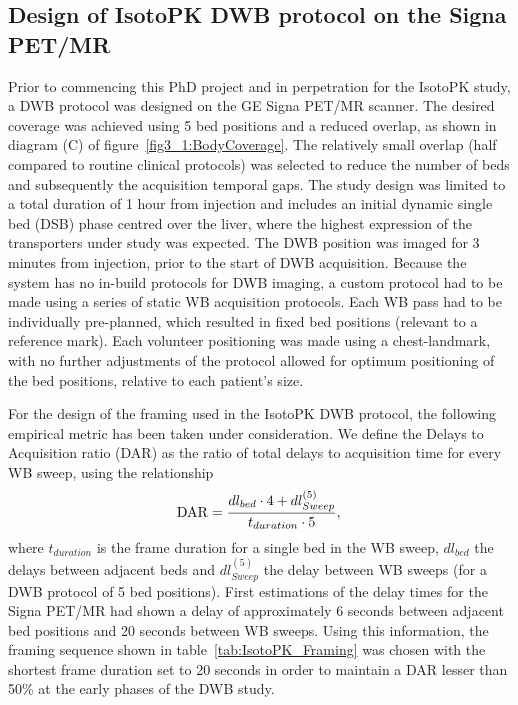 \subsection{Design of IsotoPK DWB protocol on the Signa PET/MR}
Prior to commencing this PhD project and in perpetration for the IsotoPK study, a DWB protocol was designed on the GE Signa PET/MR scanner. The desired coverage was achieved using 5 bed positions and a reduced overlap, as shown in diagram (C) of figure~\ref{fig3_1:BodyCoverage}. The relatively small overlap (half compared to routine clinical protocols) was selected to reduce the number of beds and subsequently the acquisition temporal gaps.
The study design was limited to a total duration of 1 hour from injection and includes an initial dynamic single bed (DSB) phase centred over the liver, where the highest expression of the transporters under study was expected. 
The DWB position was imaged for 3 minutes from injection, prior to the start of DWB acquisition.
Because the system has no in-build protocols for DWB imaging, a custom protocol had to be made using a series of static WB acquisition protocols. Each WB pass had to be individually pre-planned, which resulted in fixed bed positions (relevant to a reference mark). Each volunteer positioning was made using a chest-landmark, with no further adjustments of the protocol allowed for optimum positioning of the bed positions, relative to each patient's size.

For the design of the framing used in the IsotoPK DWB protocol, the following empirical metric has been taken under consideration. We define the Delays to Acquisition ratio (DAR) as the ratio of total delays to acquisition time for every WB sweep, using the relationship
\begin{equation} \label{eqn:acq_to_dead_time}
 \mathrm{DAR} = \frac{dl_{bed}\cdot 4 + dl_{Sweep}^{(5)}}{t_{duration}\cdot 5 }  \\ , \\ 
\end{equation}
where $t_{duration}$ is the frame duration for a single bed in the WB sweep, $dl_{bed}$ the delays between adjacent beds and $dl_{Sweep}^{(5)}$ the delay between WB sweeps (for a DWB protocol of 5 bed positions).
First estimations of the delay times for the Signa PET/MR had shown a delay of approximately 6 seconds between adjacent bed positions and 20 seconds between WB sweeps. Using this information, the framing sequence shown in table~\ref{tab:IsotoPK_Framing} was chosen with the shortest frame duration set to 20 seconds in order to maintain a DAR lesser than 50\% at the early phases of the DWB study. 

